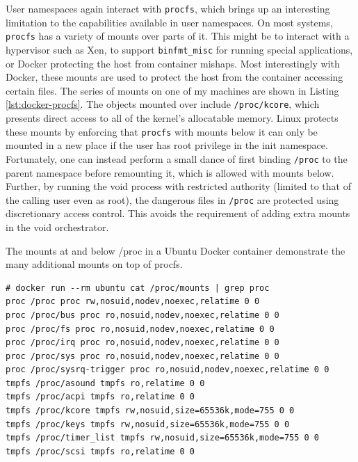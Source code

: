 \documentclass[12pt,a4paper,twoside]{report}
\begin{document}
User namespaces again interact with \texttt{procfs}, which brings up an interesting limitation to the capabilities available in user namespaces. On most systems, \texttt{procfs} has a variety of mounts over parts of it. This might be to interact with a hypervisor such as Xen, to support \texttt{binfmt\_misc} for running special applications, or Docker protecting the host from container mishaps. Most interestingly with Docker, these mounts are used to protect the host from the container accessing certain files. The series of mounts on one of my machines are shown in Listing \ref{lst:docker-procfs}. The objects mounted over include \texttt{/proc/kcore}, which presents direct access to all of the kernel's allocatable memory. Linux protects these mounts by enforcing that \texttt{procfs} with mounts below it can only be mounted in a new place if the user has root privilege in the init namespace. Fortunately, one can instead perform a small dance of first binding \texttt{/proc} to the parent namespace before remounting it, which is allowed with mounts below. Further, by running the void process with restricted authority (limited to that of the calling user even as root), the dangerous files in \texttt{/proc} are protected using discretionary access control. This avoids the requirement of adding extra mounts in the void orchestrator.

\begin{listing}
\label{lst:docker-procfs}
\caption{The mounts at and below /proc in a Ubuntu Docker container demonstrate the many additional mounts on top of procfs.}

\begin{verbatim}
# docker run --rm ubuntu cat /proc/mounts | grep proc
proc /proc proc rw,nosuid,nodev,noexec,relatime 0 0
proc /proc/bus proc ro,nosuid,nodev,noexec,relatime 0 0
proc /proc/fs proc ro,nosuid,nodev,noexec,relatime 0 0
proc /proc/irq proc ro,nosuid,nodev,noexec,relatime 0 0
proc /proc/sys proc ro,nosuid,nodev,noexec,relatime 0 0
proc /proc/sysrq-trigger proc ro,nosuid,nodev,noexec,relatime 0 0
tmpfs /proc/asound tmpfs ro,relatime 0 0
tmpfs /proc/acpi tmpfs ro,relatime 0 0
tmpfs /proc/kcore tmpfs rw,nosuid,size=65536k,mode=755 0 0
tmpfs /proc/keys tmpfs rw,nosuid,size=65536k,mode=755 0 0
tmpfs /proc/timer_list tmpfs rw,nosuid,size=65536k,mode=755 0 0
tmpfs /proc/scsi tmpfs ro,relatime 0 0
\end{verbatim}
\end{listing}

\end{document}

